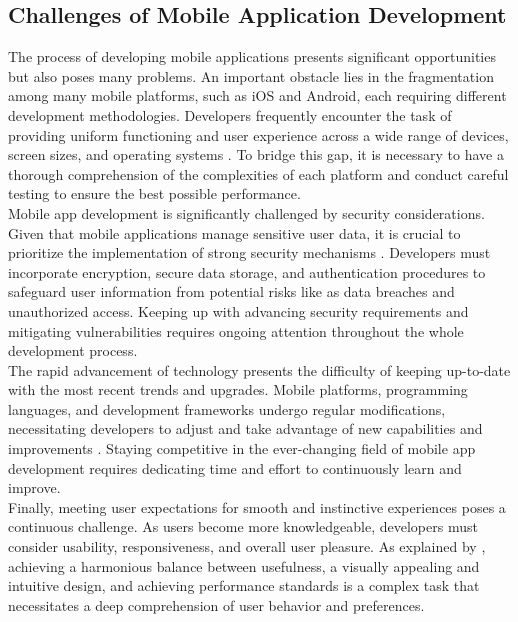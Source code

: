 \subsection{Challenges of Mobile Application Development}
The process of developing mobile applications presents significant opportunities but also poses many problems. An important obstacle lies in the fragmentation among many mobile platforms, such as iOS and Android, each requiring different development methodologies. Developers frequently encounter the task of providing uniform functioning and user experience across a wide range of devices, screen sizes, and operating systems \parencite{syeed21}. To bridge this gap, it is necessary to have a thorough comprehension of the complexities of each platform and conduct careful testing to ensure the best possible performance. \\

Mobile app development is significantly challenged by security considerations. Given that mobile applications manage sensitive user data, it is crucial to prioritize the implementation of strong security mechanisms \parencite{wambua23}. Developers must incorporate encryption, secure data storage, and authentication procedures to safeguard user information from potential risks like as data breaches and unauthorized access. Keeping up with advancing security requirements and mitigating vulnerabilities requires ongoing attention throughout the whole development process. \\

The rapid advancement of technology presents the difficulty of keeping up-to-date with the most recent trends and upgrades. Mobile platforms, programming languages, and development frameworks undergo regular modifications, necessitating developers to adjust and take advantage of new capabilities and improvements \parencite{syeed21}. Staying competitive in the ever-changing field of mobile app development requires dedicating time and effort to continuously learn and improve. \\

Finally, meeting user expectations for smooth and instinctive experiences poses a continuous challenge. As users become more knowledgeable, developers must consider usability, responsiveness, and overall user pleasure. As explained by \textcite{olawole18}, achieving a harmonious balance between usefulness, a visually appealing and intuitive design, and achieving performance standards is a complex task that necessitates a deep comprehension of user behavior and preferences.

